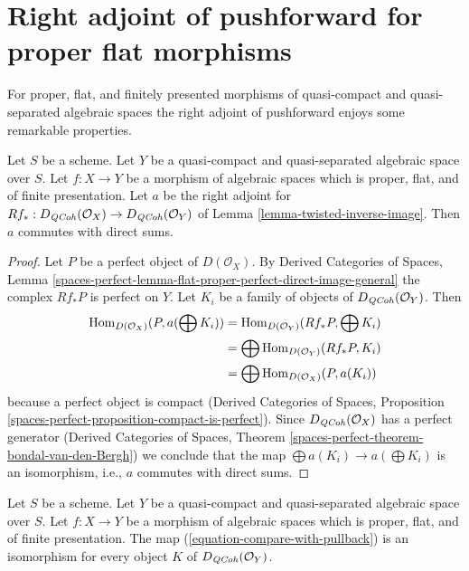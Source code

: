 \section{Right adjoint of pushforward for proper flat morphisms}
\label{section-proper-flat}

\noindent
For proper, flat, and finitely presented morphisms of quasi-compact
and quasi-separated algebraic spaces the right adjoint of pushforward
enjoys some remarkable properties.

\begin{lemma}
\label{lemma-proper-flat}
Let $S$ be a scheme.
Let $Y$ be a quasi-compact and quasi-separated algebraic space over $S$.
Let $f : X \to Y$ be a morphism of algebraic spaces which is proper, flat, and
of finite presentation.
Let $a$ be the right adjoint for
$Rf_* : D_{\mathit{QCoh}}(\mathcal{O}_X) \to D_{\mathit{QCoh}}(\mathcal{O}_Y)$ of
Lemma \ref{lemma-twisted-inverse-image}. Then $a$ commutes with direct sums.
\end{lemma}

\begin{proof}
Let $P$ be a perfect object of $D(\mathcal{O}_X)$. By
Derived Categories of Spaces, Lemma
\ref{spaces-perfect-lemma-flat-proper-perfect-direct-image-general}
the complex $Rf_*P$ is perfect on $Y$.
Let $K_i$ be a family of objects of $D_{\mathit{QCoh}}(\mathcal{O}_Y)$.
Then
\begin{align*}
\mathop{\mathrm{Hom}}\nolimits_{D(\mathcal{O}_X)}(P, a(\bigoplus K_i))
& =
\mathop{\mathrm{Hom}}\nolimits_{D(\mathcal{O}_Y)}(Rf_*P, \bigoplus K_i) \\
& =
\bigoplus \mathop{\mathrm{Hom}}\nolimits_{D(\mathcal{O}_Y)}(Rf_*P, K_i) \\
& =
\bigoplus \mathop{\mathrm{Hom}}\nolimits_{D(\mathcal{O}_X)}(P, a(K_i))
\end{align*}
because a perfect object is compact (Derived Categories of Spaces,
Proposition \ref{spaces-perfect-proposition-compact-is-perfect}).
Since $D_{\mathit{QCoh}}(\mathcal{O}_X)$ has a perfect generator
(Derived Categories of Spaces, Theorem
\ref{spaces-perfect-theorem-bondal-van-den-Bergh})
we conclude that the map $\bigoplus a(K_i) \to a(\bigoplus K_i)$
is an isomorphism, i.e., $a$ commutes with direct sums.
\end{proof}

\begin{lemma}
\label{lemma-compare-with-pullback-flat-proper}
Let $S$ be a scheme.
Let $Y$ be a quasi-compact and quasi-separated algebraic space over $S$.
Let $f : X \to Y$ be a morphism of algebraic spaces which is proper, flat, and
of finite presentation.
The map (\ref{equation-compare-with-pullback}) is an isomorphism
for every object $K$ of $D_{\mathit{QCoh}}(\mathcal{O}_Y)$.
\end{lemma}

